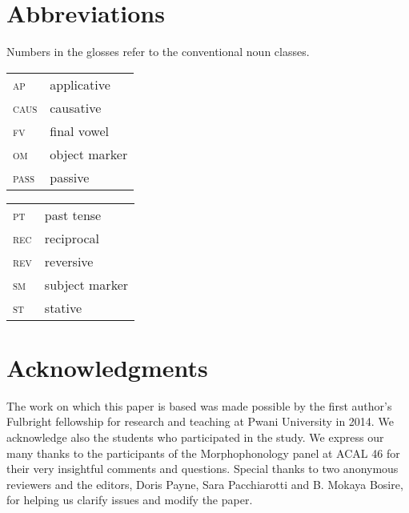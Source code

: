 \documentclass[output=paper]{langsci/langscibook}
\begin{document}
\section*{Abbreviations} 

Numbers in the glosses refer to the conventional  noun classes.\\

\begin{tabularx}{.45\textwidth}{lX}
\textsc{ap} & applicative  \\
\textsc{caus} &  causative  \\ 
\textsc{fv} &  final vowel \\
\textsc{om} & object marker \\ 
\textsc{pass} & passive  \\
\end{tabularx}
\begin{tabularx}{.45\textwidth}{lX}
\textsc{pt} & past tense \\
\textsc{rec} & reciprocal  \\
\textsc{rev} & reversive \\ 
\textsc{sm} & subject marker \\
\textsc{st} & stative \\
\end{tabularx}       

\section*{Acknowledgments }

The work on which this paper is based was made possible by the first author’s Fulbright fellowship for research and teaching at Pwani University in 2014. We acknowledge also the students who participated in the study. We express our many thanks to the participants of the Morphophonology panel at ACAL 46 for their very insightful comments and questions. Special thanks to two anonymous reviewers and the editors, Doris Payne, Sara Pacchiarotti and B. Mokaya Bosire, for helping us clarify issues and modify the paper. 

\printbibliography[heading=subbibliography,notkeyword=this]
\end{document}
